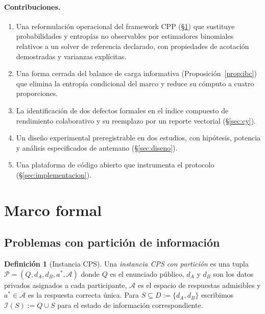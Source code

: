 \documentclass[11pt,a4paper]{article}
\theoremstyle{definition}
\newtheorem{definicion}{Definición}[section]
\theoremstyle{plain}
\theoremstyle{remark}
\newcommand{\Info}{\mathcal{I}}
\begin{document}
\paragraph{Contribuciones.}
\begin{enumerate}
  \item Una reformulación operacional del framework CPP (§\ref{sec:marco}) que
        sustituye probabilidades y entropías no observables por estimadores
        binomiales relativos a un solver de referencia declarado, con propiedades
        de acotación demostradas y varianzas explícitas.
  \item Una forma cerrada del balance de carga informativa
        (Proposición~\ref{prop:ibc}) que elimina la entropía condicional del
        marco y reduce su cómputo a cuatro proporciones.
  \item La identificación de dos defectos formales en el índice compuesto de
        rendimiento colaborativo y su reemplazo por un reporte vectorial
        (§\ref{sec:cy}).
  \item Un diseño experimental preregistrable en dos estudios, con hipótesis,
        potencia y análisis especificados de antemano (§\ref{sec:diseno}).
  \item Una plataforma de código abierto que instrumenta el protocolo
        (§\ref{sec:implementacion}).
\end{enumerate}

\section{Marco formal}\label{sec:marco}

\subsection{Problemas con partición de información}

\begin{definicion}[Instancia CPS]\label{def:instancia}
Una \emph{instancia CPS con partición} es una tupla
$\mathcal{P}=(Q, d_A, d_B, a^\ast, \mathcal{A})$ donde $Q$ es el enunciado público,
$d_A$ y $d_B$ son los datos privados asignados a cada participante,
$\mathcal{A}$ es el espacio de respuestas admisibles y $a^\ast\in\mathcal{A}$ es
la respuesta correcta única. Para $S\subseteq D:=\{d_A,d_B\}$ escribimos
$\Info(S) := Q\cup S$ para el estado de información correspondiente.
\end{definicion}
\end{document}
